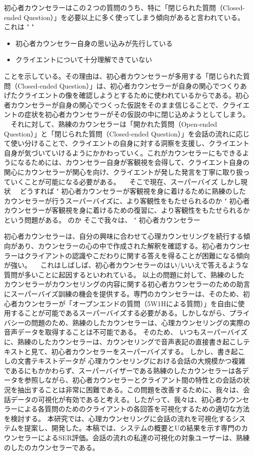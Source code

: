 \documentclass[shuuron]{kuee}
\begin{document}
初心者カウンセラーはこの２つの質問のうち、特に「閉じられた質問（Closed-ended Question）」を必要以上に多く使ってしまう傾向があると言われている。これは
"
"
\begin{itemize}
\item 初心者カウンセラー自身の思い込みが先行している
\item クライエントについて十分理解できていない
\end{itemize}
ことを示している。その理由は、初心者カウンセラーが多用する「閉じられた質問（Closed-ended Question）」は、初心者カウンセラーが自身の関心でつくりあげたクライエントの像を確認しようとするために使われているからである。初心者カウンセラーが自身の関心でつくった仮説をそのまま信じることで、クライエントの症状を初心者カウンセラーがその仮説の中に閉じ込めようとしてしまう。
　それに対して、熟練のカウンセラーは「開かれた質問（Open-ended Question）」と「閉じられた質問（Closed-ended Question）」を会話の流れに応じて使い分けることで、クライエントの自身に対する洞察を支援し、クライエント自身が気づいていけるようにかかわっていく。これがカウンセラーにもできるようになるためには、カウンセラー自身が客観視を会得して、クライエント自身の関心にカウンセラーが関心を向け、クライエントが発した発言を丁寧に取り扱っていくことが可能になる必要がある。
　そこで現在、スーパーバイズ
しかし現状　
どうすれば
"	初心者カウンセラーが客観視を身に着けるために熟練のしたカウンセラーが行うスーパーバイズに、より客観性をもたせられるのか
"	初心者カウンセラーが客観視を身に着けるための復習に、より客観性をもたせられるか
という問題がある。
のか
そこで我々は、
"	初心者カウンセラー


  初心者カウンセラーは、自分の興味に合わせて心理カウンセリングを続行する傾向があり、カウンセラーの心の中で作成された解釈を確認する。初心者カウンセラーはクライアントの認識やこだわりに関する答えを得ることが困難になる傾向が強い。
　これはしばしば、初心者カウンセラーのはい/いいえで答えるような質問が多いことに起因するといわれている。
 以上の問題に対して、熟練のしたカウンセラーがカウンセリングの内容に関する初心者カウンセラーのための助言にスーパーバイズ訓練の機会を提供する。専門のカウンセラーは、そのため、初心者カウンセラーが「オープンエンドの質問（5W1Hによる質問）」を自由に使用することが可能であるスーパーバイズする必要がある。しかしながら、プライバシーの問題のため、熟練のしたカウンセラーは、心理カウンセリングの実際の音声データを取得することは不可能である。 そのため、 いつもスーパーバイズに、熟練のしたカウンセラーは、カウンセリングで音声表記の直接書き起こしテキストと見て、初心者カウンセラーをスーパーバイズする。
  しかし、書き起こしの文書テキストデータが 心理カウンセリングにおける会話の大規模かつ複雑であるにもかかわらず、スーパーバイザーである熟練のしたカウンセラーは各データを参照しながら、初心者カウンセラーとクライアント間の特性との会話の状況を抽出することは非常に困難である。この問題を改善するために、我々は、会話データの可視化が有効であると考える。したがって、我々は、初心者カウンセラーによる各質問のためのクライアントの各回答を可視化するための適切な方法を検討する。
  本研究では、心理カウンセリングに会話の流れを可視化するシステムを提案し、開発した。本稿では、システムの概要とUの結果を示す専門のカウンセラーによるSER評価。会話の流れの私達の可視化の対象ユーザーは、熟練のしたのカウンセラーである。
\end{document}
